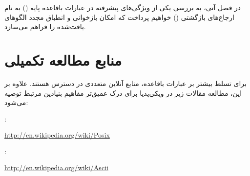 در فصل آتی، به بررسی یکی از ویژگی‌های پیشرفته در عبارات باقاعده پایه () به نام ارجاع‌های بازگشتی () خواهیم پرداخت که امکان بازخوانی و انطباق مجدد الگوهای یافت‌شده را فراهم می‌سازد.

\section{منابع مطالعه تکمیلی}

برای تسلط بیشتر بر عبارات باقاعده، منابع آنلاین متعددی در دسترس هستند. علاوه بر این، مطالعه مقالات زیر در ویکی‌پدیا برای درک عمیق‌تر مفاهیم بنیادین مرتبط توصیه می‌شود:

:

\begin{latin}
\url{http://en.wikipedia.org/wiki/Posix}
\end{latin}

:

\begin{latin}
\url{http://en.wikipedia.org/wiki/Ascii}
\end{latin}